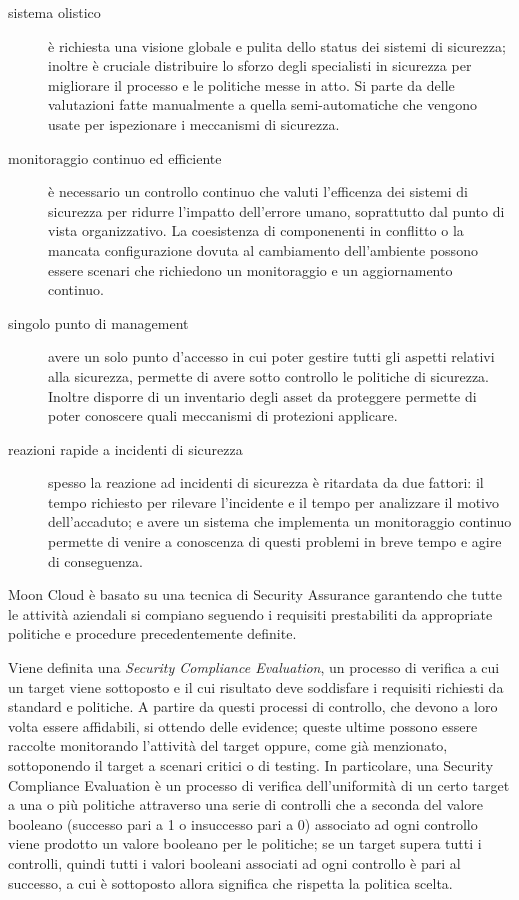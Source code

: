 \begin{description}
	\item[sistema olistico] è richiesta una visione globale e pulita dello status dei sistemi di sicurezza; inoltre è cruciale 
	distribuire lo sforzo degli specialisti in sicurezza per migliorare il processo e le politiche messe in atto. Si parte da 
	delle valutazioni fatte manualmente a quella semi-automatiche che vengono usate per ispezionare i meccanismi di sicurezza. 
	\item[monitoraggio continuo ed efficiente] è necessario un controllo continuo che valuti l'efficenza dei sistemi di sicurezza 
	per ridurre l'impatto dell'errore umano, soprattutto dal punto di vista organizzativo. La coesistenza di componenenti in conflitto o
	la mancata configurazione dovuta al	cambiamento dell'ambiente possono essere scenari che richiedono un monitoraggio e un 
	aggiornamento continuo.
	\item[singolo punto di management] avere un solo punto d'accesso in cui poter gestire tutti gli aspetti relativi alla sicurezza, 
	permette di avere sotto controllo le politiche di sicurezza. Inoltre disporre di un inventario degli asset da proteggere permette di
	poter conoscere quali meccanismi di protezioni applicare.
	\item[reazioni rapide a incidenti di sicurezza] spesso la reazione ad incidenti di sicurezza è ritardata da due fattori: il tempo 
	richiesto per rilevare l'incidente e il tempo per analizzare il motivo dell'accaduto; e avere un sistema che implementa un monitoraggio
	continuo permette di venire a conoscenza di questi problemi in breve tempo e agire di conseguenza.
	\label{list:security-assurance-fondamentals}
\end{description}


Moon Cloud è basato su una tecnica di Security Assurance garantendo che tutte le attività aziendali si compiano seguendo i requisiti 
prestabiliti da appropriate politiche e procedure precedentemente definite.

Viene definita una \textit{Security Compliance Evaluation}, un processo di verifica a cui un target viene sottoposto e il cui risultato 
deve soddisfare i requisiti richiesti da standard e politiche. A partire da questi processi di controllo, che devono a loro volta essere 
affidabili, si ottendo delle evidence; queste ultime possono essere raccolte monitorando l'attività del target oppure, come già 
menzionato, sottoponendo il target a scenari critici o di testing.
In particolare, una Security Compliance Evaluation è un processo di verifica dell'uniformità di un certo target a una o più politiche 
attraverso una serie di controlli che a seconda del valore booleano (successo pari a 1 o insuccesso pari a 0) associato ad ogni controllo viene prodotto 
un valore booleano per le politiche; se un target supera tutti i controlli, quindi tutti i valori booleani associati ad ogni controllo
è pari al successo, a cui è sottoposto allora significa che rispetta la politica scelta. 

